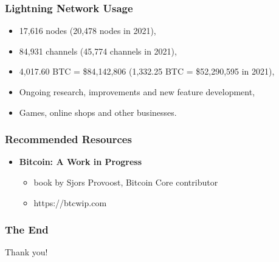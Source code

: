 \documentclass{beamer}
\begin{document}
\begin{frame}
  \frametitle{Lightning Network Usage}
  \begin{itemize}
  \item 17,616 nodes (20,478 nodes in 2021),
  \item 84,931 channels (45,774 channels in 2021),
  \item 4,017.60 BTC = \$84,142,806 (1,332.25 BTC = \$52,290,595 in 2021),
  \item Ongoing research, improvements and new feature development,
  \item Games, online shops and other businesses.
  \end{itemize}
\end{frame}

\begin{frame}
  \frametitle{Recommended Resources}
  \begin{itemize}
  \item \textbf{Bitcoin: A Work in Progress}
    \begin{itemize}
    \item book by Sjors Provoost, Bitcoin Core contributor
    \item https://btcwip.com
    \end{itemize}
  \end{itemize}
\end{frame}

\begin{frame}
  \frametitle{The End}
  \begin{center}
    Thank you!
  \end{center}
\end{frame}
\end{document}
